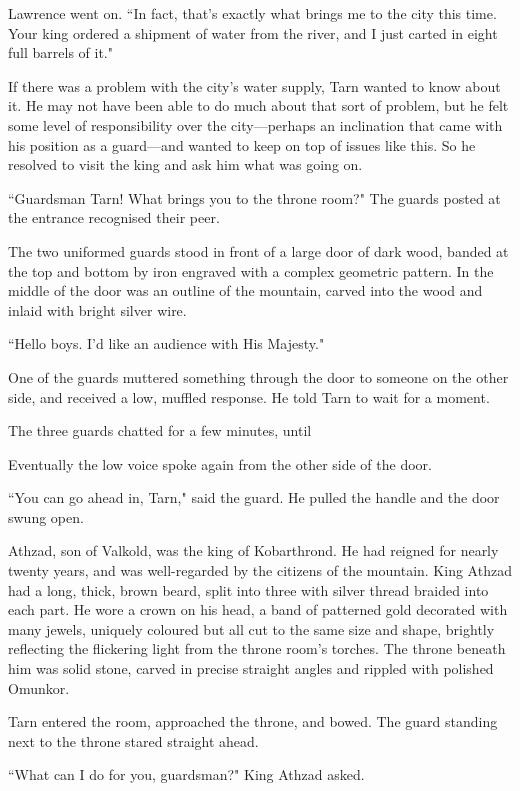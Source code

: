 Lawrence went on.  ``In fact, that's exactly what brings me to the city this time.  Your king ordered a shipment of water from the river, and I just carted in eight full barrels of it."

If there was a problem with the city's water supply, Tarn wanted to know about it.  He may not have been able to do much about that sort of problem, but he felt some level of responsibility over the city---perhaps an inclination that came with his position as a guard---and wanted to keep on top of issues like this.  So he resolved to visit the king and ask him what was going on.

\divider

``Guardsman Tarn!  What brings you to the throne room?"  The guards posted at the entrance recognised their peer.

The two uniformed guards stood in front of a large door of dark wood, banded at the top and bottom by iron engraved with a complex geometric pattern.  In the middle of the door was an outline of the mountain, carved into the wood and inlaid with bright silver wire.

``Hello boys.  I'd like an audience with His Majesty."

One of the guards muttered something through the door to someone on the other side, and received a low, muffled response.  He told Tarn to wait for a moment.

The three guards chatted for a few minutes, until 

Eventually the low voice spoke again from the other side of the door.

``You can go ahead in, Tarn," said the guard.  He pulled the handle and the door swung open.

Athzad, son of Valkold, was the king of Kobarthrond.  He had reigned for nearly twenty years, and was well-regarded by the citizens of the mountain.  King Athzad had a long, thick, brown beard, split into three with silver thread braided into each part.  He wore a crown on his head, a band of patterned gold decorated with many jewels, uniquely coloured but all cut to the same size and shape, brightly reflecting the flickering light from the throne room's torches.  The throne beneath him was solid stone, carved in precise straight angles and rippled with polished Omunkor.

Tarn entered the room, approached the throne, and bowed.  The guard standing next to the throne stared straight ahead.

``What can I do for you, guardsman?" King Athzad asked.

